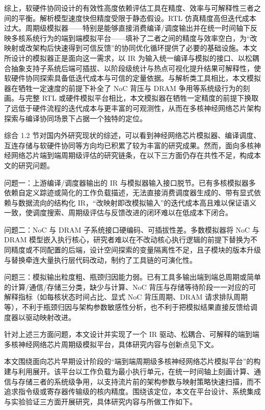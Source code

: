 综上，软硬件协同设计的有效性高度依赖评估工具在精度、效率与可解释性三者之间的平衡。解析模型速度快但精度受限于静态假设。RTL 仿真精度高但迭代成本过大。周期级模拟器——特别是能够直接消费编译/调度输出并在统一时间轴下反映多核系统行为的端到端模拟平台——填补了二者之间的精度与效率空白，为“改映射或改架构后快速得到可信反馈”的协同优化循环提供了必要的基础设施。本文所设计的模拟器正是面向这一需求，以 IR 为输入统一编译与模拟的接口、以松耦合抽象支持子系统后端可插拔、以阶段级统计与热点可视化提升结果可解释性，使软硬件协同探索具备低迭代成本与可信的定量依据。与解析类工具相比，本文模拟器在牺牲一定速度的前提下补全了 NoC 背压与 DRAM 争用等系统级行为的刻画。与完整 RTL 或硬件模拟平台相比，本文模拟器在牺牲一定精度的前提下换取了远低于硬件流程的迭代成本与更丰富的可观测性，从而在多核神经网络芯片架构探索与编译协同场景下占据一个独特的定位。


综合 1.2 节对国内外研究现状的综述，可以看到神经网络芯片模拟器、编译调度、互连存储与软硬件协同等方向均已积累了较为丰富的研究成果。然而，面向多核神经网络芯片端到端周期级评估的研究链条，在以下三方面仍存在共性不足，构成本文的研究问题。

问题一：上游编译/调度器输出的 IR 与模拟器输入接口脱节。已有多核模拟器多依赖自定义踪迹或简化的工作负载描述，无法直接消费调度器生成的、带有显式依赖与数据流向的结构化 IR，“改映射即改模拟输入”的迭代成本高且难以保证语义一致，使调度搜索、周期级评估与反馈改进的闭环难以在低成本下闭合。

问题二：NoC 与 DRAM 子系统接口硬编码、可插拔性差。多数模拟器将 NoC 与 DRAM 模型嵌入执行核心，研究者难以在不改动核心执行逻辑的前提下替换为不同精度或不同配置的后端，设计空间探索的变量隔离性不足，且子模块的版本升级与替换牵连大量执行层代码改动，制约了工具链的可演化性。

问题三：模拟输出粒度粗、瓶颈归因能力弱。已有工具多输出端到端总周期或简单的计算/通信/存储三分类，缺少与计算、NoC 背压与存储等待阶段一一对应的可解释指标（如每核状态时间占比、显式 NoC 背压周期、DRAM 请求排队周期等），不利于瓶颈归因与架构参数敏感性分析，也不利于把模拟结果直接反馈给调度器以驱动映射改进。

针对上述三方面问题，本文设计并实现了一个 IR 驱动、松耦合、可解释的端到端多核神经网络芯片周期级模拟平台，具体研究内容与创新点见下文。



本文围绕面向芯片早期设计阶段的“端到端周期级多核神经网络芯片模拟平台”的构建与利用展开。该平台以工作负载为最小执行单元，在统一时间轴上刻画计算、通信与存储三者的系统级争用，以支持流片前的架构参数与映射策略快速扫描，而不追求指令级或寄存器传输级的核内精度。围绕该定位，本文在平台设计、系统集成与实验验证三方面开展研究，具体研究内容与所做工作如下。


